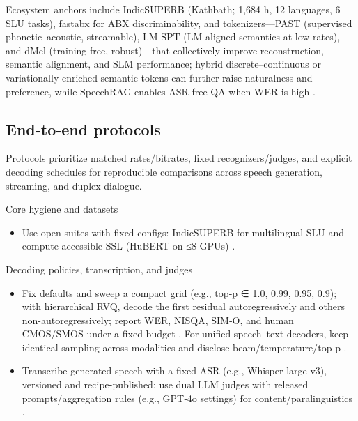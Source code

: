 \documentclass{article}
\begin{document}
Ecosystem anchors include IndicSUPERB (Kathbath; 1,684 h, 12 languages, 6 SLU tasks), fastabx for ABX discriminability, and tokenizers—PAST (supervised phonetic–acoustic, streamable), LM‑SPT (LM‑aligned semantics at low rates), and dMel (training-free, robust)—that collectively improve reconstruction, semantic alignment, and SLM performance; hybrid discrete–continuous or variationally enriched semantic tokens can further raise naturalness and preference, while SpeechRAG enables ASR-free QA when WER is high \cite{entry2025indicsuperbspeechprocessinguniversalperf,poli2025fastabxlibraryefficientcomputationabxdis,har-tuv2025pastphoneticacousticspeechtokenizer,jo2025lmsptalignedsemanticdistillationspeechto,bai2025dmelspeechtokenizationmadesimple,verma2024whispergpthybridrepresentationaudiolarge,chen2025variationalframeworkimprovingnaturalness,min2025speechretrievalaugmentedgenerationwithou}.

\subsection{End-to-end protocols} \label{subsec:End-to-end protocols}
Protocols prioritize matched rates/bitrates, fixed recognizers/judges, and explicit decoding schedules for reproducible comparisons across speech generation, streaming, and duplex dialogue.

Core hygiene and datasets
\begin{itemize}
  \item Use open suites with fixed configs: IndicSUPERB for multilingual SLU and compute-accessible SSL (HuBERT on ≤8 GPUs) \cite{entry2025indicsuperbspeechprocessinguniversalperf,chen2023reducingbarriersselfsupervisedlearninghu}.
\end{itemize}

Decoding policies, transcription, and judges
\begin{itemize}
  \item Fix defaults and sweep a compact grid (e.g., top‑p ∈ {1.0, 0.99, 0.95, 0.9}); with hierarchical RVQ, decode the first residual autoregressively and others non-autoregressively; report WER, NISQA, SIM‑O, and human CMOS/SMOS under a fixed budget \cite{li2024investigatingneuralaudiocodecsspeechlang}. For unified speech–text decoders, keep identical sampling across modalities and disclose beam/temperature/top‑p \cite{huang2025dynamicsuperbphase2collaborativelyexpand}.
  \item Transcribe generated speech with a fixed ASR (e.g., Whisper‑large‑v3), versioned and recipe-published; use dual LLM judges with released prompts/aggregation rules (e.g., GPT‑4o settings) for content/paralinguistics \cite{wang2025incorporatingcontextualparalinguisticund,wang2024blspemotowardsempatheticlargespeechlangu}.
\end{itemize}
\end{document}
